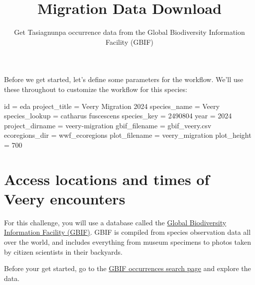 \documentclass[
]{report}
\title{Migration Data Download}
\subtitle{Get Tasiagnunpa occurrence data from the Global Biodiversity
Information Facility (GBIF)}
\author{}
\date{}
\newenvironment{Shaded}{\begin{snugshade}}{\end{snugshade}}
\newcommand{\BuiltInTok}[1]{\textcolor[rgb]{0.00,0.23,0.31}{#1}}
\newcommand{\DecValTok}[1]{\textcolor[rgb]{0.68,0.00,0.00}{#1}}
\newcommand{\NormalTok}[1]{\textcolor[rgb]{0.00,0.23,0.31}{#1}}
\newcommand{\OperatorTok}[1]{\textcolor[rgb]{0.37,0.37,0.37}{#1}}
\newcommand{\StringTok}[1]{\textcolor[rgb]{0.13,0.47,0.30}{#1}}
\begin{document}
\maketitle


Before we get started, let's define some parameters for the workflow.
We'll use these throughout to customize the workflow for this species:

\begin{Shaded}
\begin{Highlighting}[]
\BuiltInTok{id} \OperatorTok{=} \StringTok{\textquotesingle{}eda\textquotesingle{}}
\NormalTok{project\_title }\OperatorTok{=} \StringTok{\textquotesingle{}Veery Migration 2024\textquotesingle{}}
\NormalTok{species\_name }\OperatorTok{=} \StringTok{\textquotesingle{}Veery\textquotesingle{}}
\NormalTok{species\_lookup }\OperatorTok{=} \StringTok{\textquotesingle{}catharus fuscescens\textquotesingle{}}
\NormalTok{species\_key }\OperatorTok{=} \DecValTok{2490804}
\NormalTok{year }\OperatorTok{=} \DecValTok{2024}
\NormalTok{project\_dirname }\OperatorTok{=} \StringTok{\textquotesingle{}veery{-}migration\textquotesingle{}}
\NormalTok{gbif\_filename }\OperatorTok{=} \StringTok{\textquotesingle{}gbif\_veery.csv\textquotesingle{}}
\NormalTok{ecoregions\_dir }\OperatorTok{=} \StringTok{\textquotesingle{}wwf\_ecoregions\textquotesingle{}}
\NormalTok{plot\_filename }\OperatorTok{=} \StringTok{\textquotesingle{}veery\_migration\textquotesingle{}}
\NormalTok{plot\_height }\OperatorTok{=} \DecValTok{700}
\end{Highlighting}
\end{Shaded}

\section{Access locations and times of Veery
encounters}\label{access-locations-and-times-of-encounters}

For this challenge, you will use a database called the
\href{https://www.gbif.org/}{Global Biodiversity Information Facility
(GBIF)}. GBIF is compiled from species observation data all over the
world, and includes everything from museum specimens to photos taken by
citizen scientists in their backyards.

\begin{tcolorbox}[enhanced jigsaw, breakable, colframe=quarto-callout-color-frame, toptitle=1mm, bottomrule=.15mm, colbacktitle=quarto-callout-color!10!white, opacityback=0, opacitybacktitle=0.6, coltitle=black, title=\textcolor{quarto-callout-color}{\faInfo}\hspace{0.5em}{Try It: Explore GBIF}, left=2mm, bottomtitle=1mm, titlerule=0mm, arc=.35mm, colback=white, rightrule=.15mm, toprule=.15mm, leftrule=.75mm]

Before your get started, go to the
\href{https://www.gbif.org/occurrence/search}{GBIF occurrences search
page} and explore the data.

\end{tcolorbox}
\end{document}

